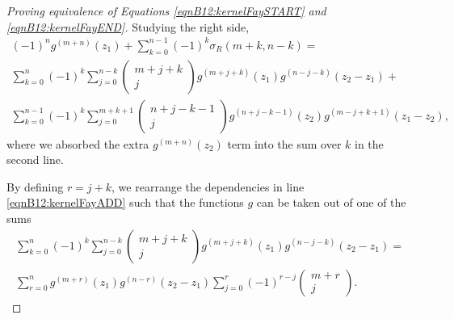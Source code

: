 \begin{proof}[Proving equivalence of Equations \ref{eqnB12:kernelFaySTART} and \ref{eqnB12:kernelFayEND}]
Studying the right side,
\begin{align}
    (-1)^n g^{(m+n)}(z_1) + \sum_{k=0}^{n-1} (-1)^k \sigma_R(m+k,n-k) = \\
    \sum_{k=0}^{n} (-1)^k \sum_{j=0}^{n-k} \begin{pmatrix} m+j+k \\ j \end{pmatrix} g^{(m+j+k)}(z_1) g^{(n-j-k)}(z_2-z_1) + \label{eqnB12:kernelFayADD} \\
    \sum_{k=0}^{n-1} (-1)^k \sum_{j=0}^{m+k+1} \begin{pmatrix} n+j-k-1 \\ j \end{pmatrix} g^{(n+j-k-1)}(z_2) g^{(m-j+k+1)}(z_1-z_2) \label{eqnB12:kernelFaySUB},
\end{align}
where we absorbed the extra $g^{(m+n)}(z_2)$ term into the sum over $k$ in the second line.

By defining $r=j+k$, we rearrange the dependencies in line \ref{eqnB12:kernelFayADD} such that the functions $g$ can be taken out of one of the sums
\begin{align}
    \sum_{k=0}^{n} (-1)^k \sum_{j=0}^{n-k} \begin{pmatrix} m+j+k \\ j \end{pmatrix} g^{(m+j+k)}(z_1) g^{(n-j-k)}(z_2-z_1) = \\
    \sum_{r=0}^{n} g^{(m+r)}(z_1) g^{(n-r)}(z_2-z_1) \sum_{j=0}^{r} (-1)^{r-j} \begin{pmatrix} m+r \\ j \end{pmatrix}.
\end{align}


\end{proof}
